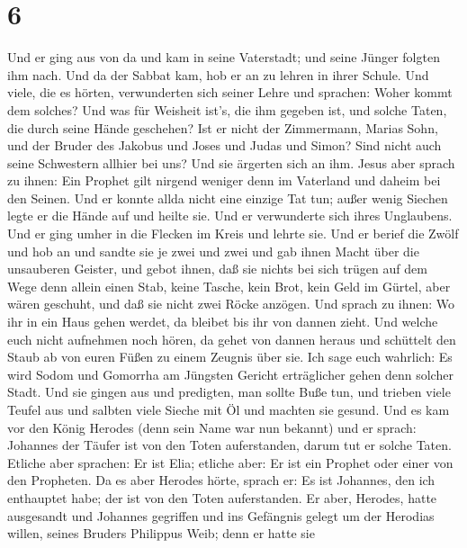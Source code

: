 \hypertarget{section-5}{%
\section{6}\label{section-5}}

 Und er ging aus von da und kam in seine Vaterstadt; und
seine Jünger folgten ihm nach.  Und da der Sabbat kam, hob
er an zu lehren in ihrer Schule. Und viele, die es hörten, verwunderten
sich seiner Lehre und sprachen: Woher kommt dem solches? Und was für
Weisheit ist's, die ihm gegeben ist, und solche Taten, die durch seine
Hände geschehen?  Ist er nicht der Zimmermann, Marias Sohn,
und der Bruder des Jakobus und Joses und Judas und Simon? Sind nicht
auch seine Schwestern allhier bei uns? Und sie ärgerten sich an ihm.
 Jesus aber sprach zu ihnen: Ein Prophet gilt nirgend
weniger denn im Vaterland und daheim bei den Seinen.  Und er
konnte allda nicht eine einzige Tat tun; außer wenig Siechen legte er
die Hände auf und heilte sie.  Und er verwunderte sich ihres
Unglaubens. Und er ging umher in die Flecken im Kreis und lehrte sie.
 Und er berief die Zwölf und hob an und sandte sie je zwei
und zwei und gab ihnen Macht über die unsauberen Geister, 
und gebot ihnen, daß sie nichts bei sich trügen auf dem Wege denn allein
einen Stab, keine Tasche, kein Brot, kein Geld im Gürtel, 
aber wären geschuht, und daß sie nicht zwei Röcke anzögen. 
Und sprach zu ihnen: Wo ihr in ein Haus gehen werdet, da bleibet bis ihr
von dannen zieht.  Und welche euch nicht aufnehmen noch
hören, da gehet von dannen heraus und schüttelt den Staub ab von euren
Füßen zu einem Zeugnis über sie. Ich sage euch wahrlich: Es wird Sodom
und Gomorrha am Jüngsten Gericht erträglicher gehen denn solcher Stadt.
 Und sie gingen aus und predigten, man sollte Buße tun,
 und trieben viele Teufel aus und salbten viele Sieche mit
Öl und machten sie gesund.  Und es kam vor den König
Herodes (denn sein Name war nun bekannt) und er sprach: Johannes der
Täufer ist von den Toten auferstanden, darum tut er solche Taten.
 Etliche aber sprachen: Er ist Elia; etliche aber: Er ist
ein Prophet oder einer von den Propheten.  Da es aber
Herodes hörte, sprach er: Es ist Johannes, den ich enthauptet habe; der
ist von den Toten auferstanden.  Er aber, Herodes, hatte
ausgesandt und Johannes gegriffen und ins Gefängnis gelegt um der
Herodias willen, seines Bruders Philippus Weib; denn er hatte sie
